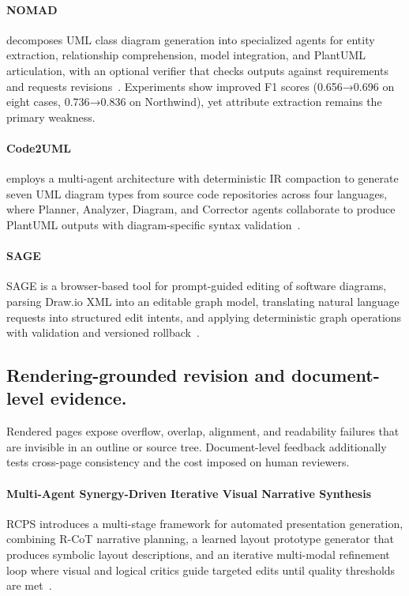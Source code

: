 \paragraph{NOMAD}
 decomposes UML class diagram generation into specialized agents for entity extraction, relationship comprehension, model integration, and PlantUML articulation, with an optional verifier that checks outputs against requirements and requests revisions~\cite{avg251122409}. Experiments show improved F1 scores (0.656→0.696 on eight cases, 0.736→0.836 on Northwind), yet attribute extraction remains the primary weakness.

\paragraph{Code2UML}
 employs a multi-agent architecture with deterministic IR compaction to generate seven UML diagram types from source code repositories across four languages, where Planner, Analyzer, Diagram, and Corrector agents collaborate to produce PlantUML outputs with diagram-specific syntax validation~\cite{avg260524453}. 

\paragraph{SAGE}
SAGE is a browser-based tool for prompt-guided editing of software diagrams, parsing Draw.io XML into an editable graph model, translating natural language requests into structured edit intents, and applying deterministic graph operations with validation and versioned rollback~\cite{avg260701102}. 

\subsection{Rendering-grounded revision and document-level evidence.}
Rendered pages expose overflow, overlap, alignment, and readability failures that are invisible in an outline or source tree. Document-level feedback additionally tests cross-page consistency and the cost imposed on human reviewers.

\paragraph{Multi-Agent Synergy-Driven Iterative Visual Narrative Synthesis}
RCPS introduces a multi-stage framework for automated presentation generation, combining R-CoT narrative planning, a learned layout prototype generator that produces symbolic layout descriptions, and an iterative multi-modal refinement loop where visual and logical critics guide targeted edits until quality thresholds are met~\cite{avg250713285}.

